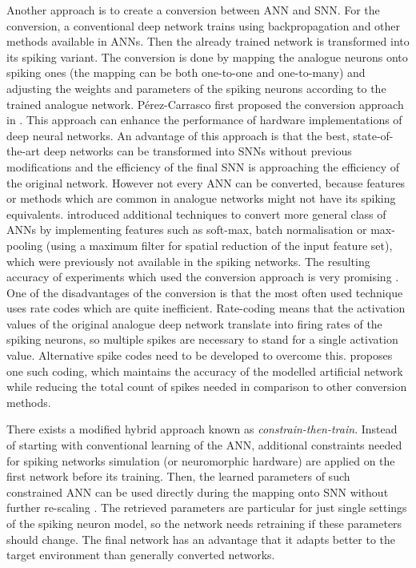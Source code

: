 Another approach is to create a conversion between ANN and SNN. For the conversion, a conventional deep network trains using backpropagation and other methods available in ANNs. Then the already trained network is transformed into its spiking variant. The conversion is done by mapping the analogue neurons onto spiking ones (the mapping can be both one-to-one and one-to-many) and adjusting the weights and parameters of the spiking neurons according to the trained analogue network. Pérez-Carrasco first proposed the conversion approach in \cite{perez-carrascoMappingFrameDriven13}. This approach can enhance the performance of hardware implementations of deep neural networks. An advantage of this approach is that the best, state-of-the-art deep networks can be transformed into SNNs without previous modifications and the efficiency of the final SNN is approaching the efficiency of the original network. However not every ANN can be converted, because features or methods which are common in analogue networks might not have its spiking equivalents. \cite{rueckauerConversionContinuousValuedDeep2017} introduced additional techniques to convert more general class of ANNs by implementing features such as soft-max, batch normalisation or max-pooling (using a maximum filter for spatial reduction of the input feature set), which were previously not available in the spiking networks. The resulting accuracy of experiments which used the conversion approach is very promising \cite{tavanaeiDeepLearningSpiking2019, pfeifferDeepLearningSpiking2018}. One of the disadvantages of the conversion is that the most often used technique uses rate codes which are quite inefficient. Rate-coding means that the activation values of the original analogue deep network translate into firing rates of the spiking neurons, so multiple spikes are necessary to stand for a single activation value. Alternative spike codes need to be developed to overcome this. \cite{zambranoFastEfficientAsynchronous2016} proposes one such coding, which maintains the accuracy of the modelled artificial network while reducing the total count of spikes needed in comparison to other conversion methods. \par
There exists a modified hybrid approach known as \textit{constrain-then-train}. Instead of starting with conventional learning of the ANN, additional constraints needed for spiking networks simulation (or neuromorphic hardware) are applied on the first network before its training. Then, the learned parameters of such constrained ANN can be used directly during the mapping onto SNN without further re-scaling \cite{pfeifferDeepLearningSpiking2018}. The retrieved parameters are particular for just single settings of the spiking neuron model, so the network needs retraining if these parameters should change. The final network has an advantage that it adapts better to the target environment than generally converted networks. \par
